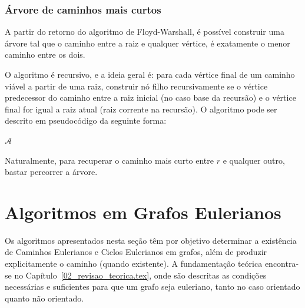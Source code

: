 \subsubsection{Árvore de caminhos mais curtos}

A partir do retorno do algoritmo de Floyd-Warshall, é possível
construir uma árvore tal que o caminho entre a raiz e qualquer
vértice, é exatamente o menor caminho entre os dois.

O algoritmo é recursivo, e a ideia geral é: para cada vértice final
de um caminho viável a partir de uma raiz, construir nó filho
recursivamente se o vértice predecessor do caminho entre a raiz
inicial (no caso base da recursão) e o vértice final for igual a raiz
atual (raiz corrente na recursão). O algoritmo pode ser descrito em
pseudocódigo da seguinte forma:

\begin{algorithm}
  \caption{Algoritmo de construção da árvore de caminhos mais curtos}
  \begin{algorithmic}[0]
    \State
          \EndIf
        \EndIf
      \EndFor
      \State \Return $\mathcal{A}$
    \EndFunction
  \end{algorithmic}
\end{algorithm}

Naturalmente, para recuperar o caminho mais curto entre $r$ e qualquer outro,
bastar percorrer a árvore.

\section{Algoritmos em Grafos Eulerianos}
\label{sec:pseudocode_hierholzer}

Os algoritmos apresentados nesta seção têm por objetivo determinar a
existência de Caminhos Eulerianos e Ciclos Eulerianos em grafos, além
de produzir explicitamente o caminho (quando existente). A fundamentação
teórica encontra-se no Capítulo~\ref{02_revisao_teorica.tex}, onde são
descritas as condições necessárias e suficientes para que um grafo seja
euleriano, tanto no caso orientado quanto não orientado.

